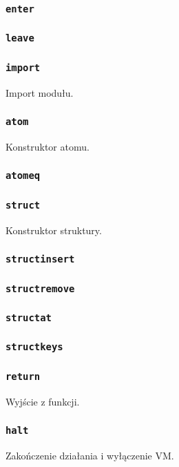 \subsubsection{\texttt{enter}}
\subsubsection{\texttt{leave}}

\subsubsection{\texttt{import}}

Import modułu.

\subsubsection{\texttt{atom}}

Konstruktor atomu.

\subsubsection{\texttt{atomeq}}

\subsubsection{\texttt{struct}}

Konstruktor struktury.

\subsubsection{\texttt{structinsert}}
\subsubsection{\texttt{structremove}}
\subsubsection{\texttt{structat}}
\subsubsection{\texttt{structkeys}}

\subsubsection{\texttt{return}}

Wyjście z funkcji.

\subsubsection{\texttt{halt}}

Zakończenie działania i wyłączenie VM.
